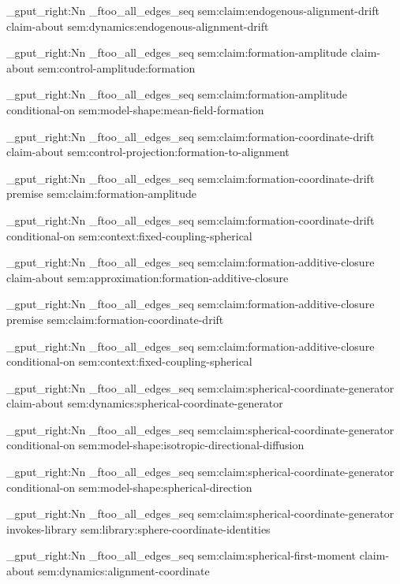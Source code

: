 \seq_gput_right:Nn \g_ftoo_all_edges_seq { { sem:claim:endogenous-alignment-drift } { claim-about } { sem:dynamics:endogenous-alignment-drift } }

\seq_gput_right:Nn \g_ftoo_all_edges_seq { { sem:claim:formation-amplitude } { claim-about } { sem:control-amplitude:formation } }

\seq_gput_right:Nn \g_ftoo_all_edges_seq { { sem:claim:formation-amplitude } { conditional-on } { sem:model-shape:mean-field-formation } }

\seq_gput_right:Nn \g_ftoo_all_edges_seq { { sem:claim:formation-coordinate-drift } { claim-about } { sem:control-projection:formation-to-alignment } }

\seq_gput_right:Nn \g_ftoo_all_edges_seq { { sem:claim:formation-coordinate-drift } { premise } { sem:claim:formation-amplitude } }

\seq_gput_right:Nn \g_ftoo_all_edges_seq { { sem:claim:formation-coordinate-drift } { conditional-on } { sem:context:fixed-coupling-spherical } }

\seq_gput_right:Nn \g_ftoo_all_edges_seq { { sem:claim:formation-additive-closure } { claim-about } { sem:approximation:formation-additive-closure } }

\seq_gput_right:Nn \g_ftoo_all_edges_seq { { sem:claim:formation-additive-closure } { premise } { sem:claim:formation-coordinate-drift } }

\seq_gput_right:Nn \g_ftoo_all_edges_seq { { sem:claim:formation-additive-closure } { conditional-on } { sem:context:fixed-coupling-spherical } }

\seq_gput_right:Nn \g_ftoo_all_edges_seq { { sem:claim:spherical-coordinate-generator } { claim-about } { sem:dynamics:spherical-coordinate-generator } }

\seq_gput_right:Nn \g_ftoo_all_edges_seq { { sem:claim:spherical-coordinate-generator } { conditional-on } { sem:model-shape:isotropic-directional-diffusion } }

\seq_gput_right:Nn \g_ftoo_all_edges_seq { { sem:claim:spherical-coordinate-generator } { conditional-on } { sem:model-shape:spherical-direction } }

\seq_gput_right:Nn \g_ftoo_all_edges_seq { { sem:claim:spherical-coordinate-generator } { invokes-library } { sem:library:sphere-coordinate-identities } }

\seq_gput_right:Nn \g_ftoo_all_edges_seq { { sem:claim:spherical-first-moment } { claim-about } { sem:dynamics:alignment-coordinate } }

